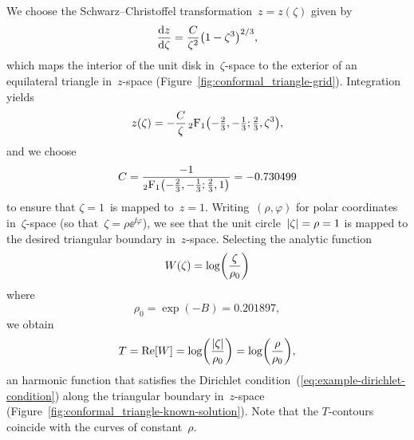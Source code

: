 We choose the Schwarz--Christoffel transformation~$z = z (\zeta)$
given by
\begin{equation}
  \tder{z}{\zeta} = \frac{C}{\zeta^2} \roundbr*{1 - \zeta^3}^{2/3},
  \label{eq:conformal_triangle-mapping-derivative}
\end{equation}
which maps the interior of the unit disk in~$\zeta$-space
to the exterior of an equilateral triangle in~$z$-space
(Figure~\ref{fig:conformal_triangle-grid}).
Integration yields
\begin{equation}
  z (\zeta) =
    -\frac{C}{\zeta}
    \hypergeo \roundbr*{-\tfrac{2}{3}, -\tfrac{1}{3}; \tfrac{2}{3}, \zeta^3},
  \label{eq:conformal_triangle-mapping}
\end{equation}
and we choose
\begin{equation}
  C =
    \frac{
      -1
    }{
      \hypergeo \roundbr*{-\tfrac{2}{3}, -\tfrac{1}{3}; \tfrac{2}{3}, 1}
    }
    = -0.730499
  \label{eq:conformal_triangle-mapping-constant}
\end{equation}
to ensure that $\zeta = 1$~is mapped to~$z = 1$.
Writing~$(\rho, \varphi)$ for polar coordinates in~$\zeta$-space
(so that~$\zeta = \rho \ee^{\ii \varphi}$),
we see that the unit circle~$\lvert\zeta\rvert = \rho = 1$
is mapped to the desired triangular boundary in~$z$-space.
Selecting the analytic function
\begin{equation}
  W (\zeta) = \log \roundbr*{\frac{\zeta}{\rho_0}}
  \label{eq:conformal_triangle-analytic-function}
\end{equation}
where
\begin{equation}
  \rho_0 = \exp (-B) = 0.201897,
  \label{eq:conformal_triangle-minimum-zeta-radius}
\end{equation}
we obtain
\begin{equation}
  T = \re [W]
    = \log \roundbr*{\frac{\abs{\zeta}}{\rho_0}}
    = \log \roundbr*{\frac{\rho}{\rho_0}},
  \label{eq:conformal_triangle-known-solution}
\end{equation}
an harmonic function that satisfies
the Dirichlet condition~(\ref{eq:example-dirichlet-condition})
along the triangular boundary in~$z$-space
(Figure~\ref{fig:conformal_triangle-known-solution}).
Note that the $T$-contours coincide
with the curves of constant~$\rho$.

\begin{figure}
\end{figure}

